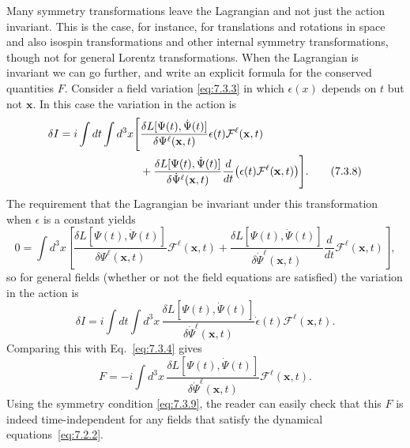 Many symmetry transformations leave the Lagrangian and not just the action
invariant. This is the case, for instance, for translations and rotations in
space and also isospin transformations and other internal symmetry
transformations, though not for general Lorentz transformations. When the
Lagrangian is invariant we can go further, and write an explicit formula for
the conserved quantities $F$. Consider a field variation \eqref{eq:7.3.3} in which
$\epsilon(x)$ depends on $t$ but not $\mathbf{x}$. In this case the variation in
the action is
\begin{align}
\delta I=i\int dt\int d^3x\Bigg[&
\frac{\delta L[\Psi(t),\dot\Psi(t)]}{\delta\Psi^\ell(\mathbf{x},t)}
\epsilon(t)\mathcal{F}^\ell(\mathbf{x},t)\notag\\
&+\frac{\delta L[\Psi(t),\dot\Psi(t)]}{\delta\dot\Psi^\ell(\mathbf{x},t)}
\frac{d}{dt}\bigl(\epsilon(t)\mathcal{F}^\ell(\mathbf{x},t)\bigr)\Bigg].
\tag{7.3.8}\label{eq:7.3.8}
\end{align}
The requirement that the Lagrangian be invariant under this transformation
when $\epsilon$ is a constant yields
\begin{equation}
0=\int d^3x\left[
\frac{\delta L[\Psi(t),\dot\Psi(t)]}{\delta\Psi^\ell(\mathbf{x},t)}
\mathcal{F}^\ell(\mathbf{x},t)
+\frac{\delta L[\Psi(t),\dot\Psi(t)]}{\delta\dot\Psi^\ell(\mathbf{x},t)}
\frac{d}{dt}\mathcal{F}^\ell(\mathbf{x},t)\right],
\tag{7.3.9}\label{eq:7.3.9}
\end{equation}
so for general fields (whether or not the field equations are satisfied) the
variation in the action is
\begin{equation}
\delta I=i\int dt\int d^3x\,
\frac{\delta L[\Psi(t),\dot\Psi(t)]}{\delta\dot\Psi^\ell(\mathbf{x},t)}
\dot\epsilon(t)\mathcal{F}^\ell(\mathbf{x},t).
\tag{7.3.10}\label{eq:7.3.10}
\end{equation}
Comparing this with Eq.~\eqref{eq:7.3.4} gives
\begin{equation}
F=-i\int d^3x\,
\frac{\delta L[\Psi(t),\dot\Psi(t)]}{\delta\dot\Psi^\ell(\mathbf{x},t)}
\mathcal{F}^\ell(\mathbf{x},t).
\tag{7.3.11}\label{eq:7.3.11}
\end{equation}
Using the symmetry condition \eqref{eq:7.3.9}, the reader can easily check that this
$F$ is indeed time-independent for any fields that satisfy the dynamical
equations~\eqref{eq:7.2.2}.

